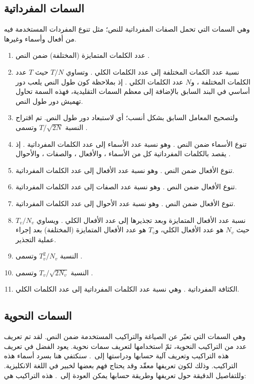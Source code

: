\subsection{السمات المفرداتية }
وهي السمات التي تحمل الصفات المفرداتية للنص؛
مثل تنوع المفردات المستخدمة فيه من أفعال وأسماء وغيرها.
\begin{enumerate}[resume]
	\item 
	عدد الكلمات المتمايزة (المختلفة) ضمن النص .
	\item 
	نسبة عدد الكمات المختلفة إلى عدد الكلمات الكلي .
	وتساوي $T/N$ حيث $T$ عدد الكلمات المختلفة ،
	و$N$ عدد الكلمات الكلي .
	إذ بملاحظة كون طول النص يلعب دور أساسي في البند السابق بالإضافة إلى معظم السمات التقليدية،
	فهذه السمة تحاول تهميش دور طول النص.
	\item 
	ولتصحيح المعامل السابق بشكل أنسب؛ أي لاستبعاد دور طول النص.
	تم اقتراح النسبة $T/\sqrt{2N}$ وتسمى .
	\item 
	تنوع الأسماء ضمن النص .
	وهو نسبة عدد الأسماء إلى عدد الكلمات المفرداتية .
	إذ يقصد بالكلمات المفرداتية كل من الأسماء ، والأفعال ،
	والصفات ، والأحوال .
	\item 
	تنوع الأفعال ضمن النص .
	وهو نسبة عدد الأفعال إلى عدد الكلمات المفرداتية.
	\item 
	تنوع الأفعال ضمن النص .
	وهو نسبة عدد الصفات إلى عدد الكلمات المفرداتية.
	\item 
	تنوع الأفعال ضمن النص .
	وهو نسبة عدد الأحوال إلى عدد الكلمات المفرداتية.
	\item 
	نسبة عدد الأفعال المتمايزة وبعد تجذيرها إلى عدد الأفعال الكلي .
	ويساوي $T_v/N_v$ حيث $N_v$ هو عدد الأفعال الكلي،
	و$T_v$ هو عدد الأفعال المتمايزة (المختلفة) بعد إجراء عملية التجذير.
	\item 
	النسبة $T_v^2/N_v$ وتسمى .
	\item 
	النسبة $T_v/\sqrt{2N_v}$ وتسمى .
	\item 
	الكثافة المفرداتية .
	وهي نسبة عدد الكلمات المفرداتية إلى عدد الكلمات الكلي.
\end{enumerate}



\subsection{السمات النحوية }
وهي السمات التي تعبّر عن الصياغة والتراكيب المستخدمة ضمن النص.
لقد تم تعريف عدد من التراكيب النحوية، ثمّ استخدامها لتعريف سمات نحوية.
يعود الفضل في تعريف هذه التراكيب وتعريف آلية حسابها ودراستها إلى~\cite{lu2010}.
سنكتفي هنا بسرد أسماء هذه التراكيب.
وذلك لكون تعريفها معقّد وقد يحتاج فهم بعضها لخبير في اللغة الانكليزية.
وللتفاصيل الدقيقة حول تعريفها وطريقة حسابها يمكن العودة إلى~\cite{lu2010}.
هذه التراكيب هي:

